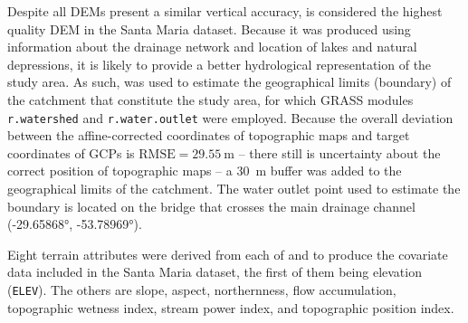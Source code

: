 

Despite all DEMs present a similar vertical accuracy, \demNew{} is considered the highest quality DEM in the 
Santa Maria dataset. Because it was produced using information about the drainage network and location of lakes 
and natural depressions, it is likely to provide a better hydrological representation of the study area. As 
such, \demNew{} was used to estimate the geographical limits (boundary) of the catchment that constitute the 
study area, for which GRASS modules \texttt{r.watershed} and \texttt{r.water.outlet} were employed. Because the 
overall deviation between the affine-corrected coordinates of topographic maps and target coordinates of GCPs 
is $\text{RMSE} = \SI{29.55}{\m}$ -- there still is uncertainty about the correct position of topographic maps 
-- a \SI{30}{\m} buffer was added to the geographical limits of the catchment. The water outlet point used to 
estimate the boundary is located on the bridge that crosses the main drainage channel (\ang{-29.65868}, 
\ang{-53.78969}).

Eight terrain attributes were derived from each of \demOld{} and \demNew{} to produce the covariate data 
included in the Santa Maria dataset, the first of them being elevation (\texttt{ELEV}). The others are slope, 
aspect, northernness, flow accumulation, topographic wetness index, stream power index, and topographic 
position index.

